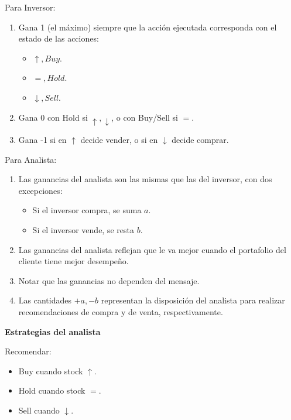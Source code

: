 \documentclass[12pt]{article}
\begin{document}
Para Inversor:

\begin{enumerate}
	\setlength{\itemsep}{0pt}
	\setlength{\parskip}{0pt}
	\setlength{\parsep}{0pt}
	\item Gana 1 (el máximo) siempre que la acción ejecutada corresponda con el estado de las acciones: \begin{itemize}
		\setlength{\itemsep}{0pt}
		\setlength{\parskip}{0pt}
		\setlength{\parsep}{0pt}
		\item $ \uparrow, Buy $.
		\item $ =, Hold $.
		\item $ \downarrow, Sell $.
	\end{itemize}
	\item Gana 0 con Hold si $ \uparrow , \downarrow  $, o con Buy/Sell si $ = $.
	\item Gana -1 si en $ \uparrow  $ decide vender, o si en $ \downarrow $ decide comprar. 
\end{enumerate}

Para Analista:

\begin{enumerate}
\setlength{\itemsep}{0pt}
\setlength{\parskip}{0pt}
\setlength{\parsep}{0pt}
	\item Las ganancias del analista son las mismas que las del inversor, con dos excepciones: \begin{itemize}
	\setlength{\itemsep}{0pt}
	\setlength{\parskip}{0pt}
	\setlength{\parsep}{0pt}
		\item Si el inversor compra, se suma $ a $.
		\item Si el inversor vende, se resta $ b $.
	\end{itemize}
	\item Las ganancias del analista reflejan que le va mejor cuando el portafolio del cliente tiene mejor desempeño.
	\item Notar que las ganancias no dependen del mensaje.
	\item Las cantidades $ +a, -b $ representan la disposición del analista para realizar recomendaciones de compra y de venta, respectivamente. 
\end{enumerate}

\textbf{Estrategias del analista}

Recomendar:

\begin{itemize}
	\setlength{\itemsep}{0pt}
	\setlength{\parskip}{0pt}
	\setlength{\parsep}{0pt}
	\item Buy cuando stock $ \uparrow $.
	\item Hold cuando stock $ = $.
	\item Sell cuando $ \downarrow  $.
\end{itemize}
\end{document}
